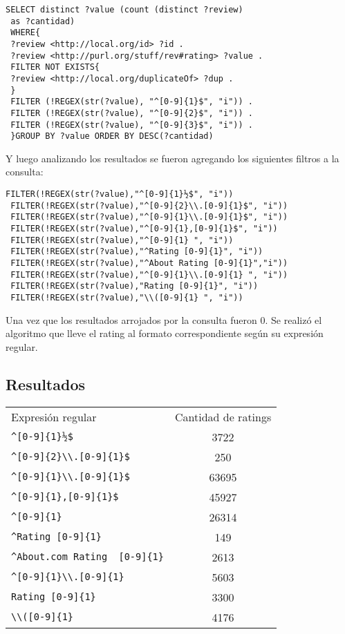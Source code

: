  \begin{lstlisting}[frame=single]
 SELECT distinct ?value (count (distinct ?review)
 as ?cantidad)
 WHERE{ 
 ?review <http://local.org/id> ?id .
 ?review <http://purl.org/stuff/rev#rating> ?value .
 FILTER NOT EXISTS{
 ?review <http://local.org/duplicateOf> ?dup .
 }
 FILTER (!REGEX(str(?value), "^[0-9]{1}$", "i")) .
 FILTER (!REGEX(str(?value), "^[0-9]{2}$", "i")) .
 FILTER (!REGEX(str(?value), "^[0-9]{3}$", "i")) .
 }GROUP BY ?value ORDER BY DESC(?cantidad)
 \end{lstlisting}
 Y luego analizando los resultados se fueron agregando los siguientes filtros a la consulta:\\
 \begin{lstlisting}[frame=single]
 FILTER(!REGEX(str(?value),"^[0-9]{1}½$", "i"))
 FILTER(!REGEX(str(?value),"^[0-9]{2}\\.[0-9]{1}$", "i"))
 FILTER(!REGEX(str(?value),"^[0-9]{1}\\.[0-9]{1}$", "i"))
 FILTER(!REGEX(str(?value),"^[0-9]{1},[0-9]{1}$", "i"))
 FILTER(!REGEX(str(?value),"^[0-9]{1} ", "i"))
 FILTER(!REGEX(str(?value),"^Rating [0-9]{1}", "i"))
 FILTER(!REGEX(str(?value),"^About Rating [0-9]{1}","i"))
 FILTER(!REGEX(str(?value),"^[0-9]{1}\\.[0-9]{1} ", "i"))
 FILTER(!REGEX(str(?value),"Rating [0-9]{1}", "i"))
 FILTER(!REGEX(str(?value),"\\([0-9]{1} ", "i"))
 \end{lstlisting}
 Una vez que los resultados arrojados por la consulta fueron 0. Se realizó el algoritmo que lleve el rating al formato correspondiente 
 según su expresión regular.\\
 
 \subsection*{Resultados}
 \begin{tabular}{| l | c |}
 Expresión regular & Cantidad de ratings \\
 \verb|^[0-9]{1}½$| & 3722\\
 \verb|^[0-9]{2}\\.[0-9]{1}$| & 250\\
 \verb|^[0-9]{1}\\.[0-9]{1}$| & 63695\\
 \verb|^[0-9]{1},[0-9]{1}$| & 45927\\
 \verb|^[0-9]{1} | & 26314\\
 \verb|^Rating [0-9]{1}| & 149\\
 \verb|^About.com Rating  [0-9]{1}| & 2613\\
 \verb|^[0-9]{1}\\.[0-9]{1} | & 5603\\
 \verb|Rating [0-9]{1}| & 3300\\
 \verb|\\([0-9]{1} | & 4176 
 \end{tabular}